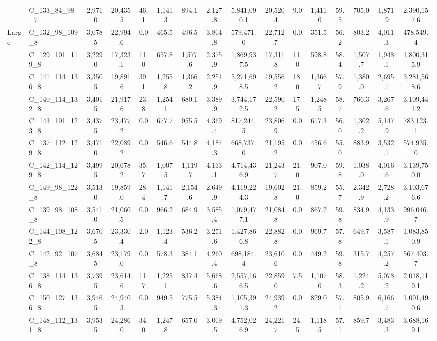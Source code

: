 \begin{table}[htb]
{\begin{tabular}{llcccccccccccccc}
     & C\_133\_84\_98\_7 & 2,971.0 & 20,435.5 & 46.1 & 1,141.3 & 894.1 & 2,127.8 & 5,841,090.1 & 20,520.4 & 9.0 & 1,411.0 & 59.5 & 705.0 & 1,871.9 & 2,390,157.6 \\
     \cmidrule(l){1-16}
    \multirow[c]{14}{*}{Large} & C\_132\_98\_109\_8 & 3,078.5 & 22,994.6 & 0.0 & 465.5 & 496.5 & 3,804.8 & 579,471.0 & 22,712.7 & 0.0 & 351.5 & 56.2 & 803.2 & 4,011.3 & 478,549.4 \\
     & C\_129\_101\_119\_8 & 3,229.0 & 17,323.1 & 11.0 & 657.8 & 1,577.6 & 2,375.9 & 1,869,937.5 & 17,311.8 & 11.0 & 598.8 & 58.4 & 1,507.7 & 1,948.1 & 1,800,315.9 \\
     & C\_141\_114\_136\_8 & 3,350.5 & 19,891.6 & 39.1 & 1,255.8 & 1,366.2 & 2,251.9 & 5,271,698.5 & 19,556.2 & 18.0 & 1,366.7 & 57.9 & 1,380.0 & 2,695.1 & 3,281,568.6 \\
     & C\_140\_114\_132\_8 & 3,401.5 & 21,917.6 & 23.8 & 1,254.1 & 680.1 & 3,389.9 & 3,744,172.5 & 22,590.2 & 17.5 & 1,248.5 & 58.7 & 766.3 & 3,267.6 & 3,109,441.2 \\
     & C\_143\_101\_123\_8 & 3,437.5 & 23,477.2 & 0.0 & 677.7 & 955.5 & 4,369.4 & 817,244.5 & 23,806.9 & 0.0 & 617.3 & 56.0 & 1,302.2 & 5,147.9 & 783,123.1 \\
     & C\_137\_112\_129\_8 & 3,471.0 & 22,089.2 & 0.0 & 546.6 & 544.8 & 4,187.3 & 668,737.0 & 21,195.2 & 0.0 & 456.6 & 55.0 & 883.9 & 3,532.1 & 574,935.0 \\
     & C\_142\_114\_129\_8 & 3,499.5 & 20,678.2 & 35.7 & 1,007.5 & 1,119.7 & 4,133.1 & 4,714,436.9 & 21,243.7 & 21.0 & 907.0 & 59.8 & 1,038.0 & 4,016.6 & 3,139,750.0 \\
     & C\_149\_98\_122\_8 & 3,513.0 & 19,859.0 & 28.4 & 1,141.7 & 2,154.6 & 2,649.9 & 4,119,224.3 & 19,602.8 & 21.0 & 859.2 & 55.7 & 2,342.9 & 2,728.2 & 3,103,676.6 \\
     & C\_139\_98\_108\_8 & 3,541.0 & 21,060.5 & 0.0 & 966.2 & 684.9 & 3,585.4 & 1,079,477.1 & 21,084.8 & 0.0 & 867.2 & 59.8 & 834.9 & 4,133.9 & 996,046.7 \\
     & C\_144\_108\_122\_8 & 3,670.5 & 23,330.4 & 2.0 & 1,123.4 & 536.2 & 3,251.6 & 1,427,866.8 & 22,882.8 & 0.0 & 969.7 & 57.8 & 649.7 & 3,587.1 & 1,083,850.9 \\
     & C\_142\_92\_107\_8 & 3,684.5 & 23,179.0 & 0.0 & 578.3 & 384.1 & 4,260.4 & 698,184.4 & 23,610.6 & 0.0 & 449.2 & 59.8 & 315.7 & 4,257.2 & 567,403.7 \\
     & C\_138\_114\_136\_8 & 3,739.5 & 23,614.6 & 11.7 & 1,225.1 & 837.4 & 5,668.6 & 2,557,166.5 & 22,859.0 & 7.5 & 1,107.0 & 58.3 & 1,224.2 & 5,078.2 & 2,018,119.1 \\
     & C\_150\_127\_136\_8 & 3,946.5 & 24,940.3 & 0.0 & 949.5 & 775.5 & 5,384.3 & 1,105,391.3 & 24,939.2 & 0.0 & 829.0 & 57.1 & 805.9 & 6,166.7 & 1,001,490.6 \\
     & C\_148\_112\_131\_8 & 3,953.5 & 24,286.0 & 34.0 & 1,247.8 & 657.0 & 3,009.5 & 4,752,026.9 & 24,221.7 & 24.5 & 1,118.5 & 57.1 & 859.7 & 3,483.3 & 3,688,169.1 \\
    \bottomrule
    \end{tabular}
    }
\end{table}
    
